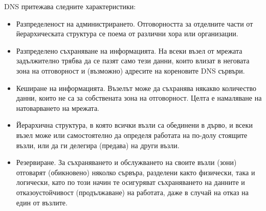 \documentclass{article}
\begin{document}
DNS притежава следните характеристики:
\begin{itemize}
    \item Разпределеност на администрирането. Отговорността за отделните части от йерархическата структура се поема от различни
    хора или организации.
    \item Разпределено съхраняване на информацията. На всеки възел от мрежата задължително трябва да се пазят само тези данни,
    които влизат в неговата зона на отговорност и (възможно) адресите на кореновите DNS сървъри.
    \item Кеширане на информацията. Възелът може да съхранява някакво количество данни, които не са за собствената зона на
    отговорност. Целта е намаляване на натоварването на мрежата.
    \item Йерархична структура, в която всички възли са обединени в дърво, и всеки възел може или самостоятелно да определя
    работата на по-долу стоящите възли, или да ги делегира (предава) на други възли.
    \item Резервиране. За съхраняването и обслужването на своите възли (зони) отговарят (обикновено) няколко сървъра, разделени
    както физически, така и логически, като по този начин те осигуряват съхраняването на данните и отказоустойчивост (продължаване)
    на работата, даже в случай на отказ на един от възлите.
\end{itemize}
\end{document}
